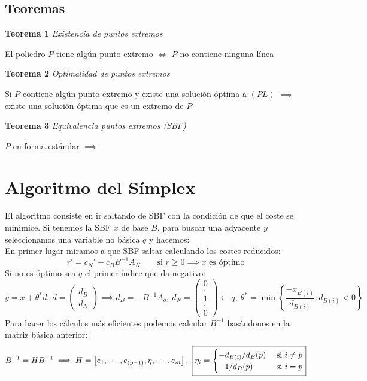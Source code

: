 \documentclass[leqno]{article}
\begin{document}
\subsection{Teoremas}
\textbf{Teorema 1} \textit{Existencia de puntos extremos}
\begin{center}
    El poliedro $P$ tiene algún punto extremo $\iff$ $P$ no contiene ninguna línea
\end{center}
\textbf{Teorema 2} \textit{Optimalidad de puntos extremos}
\begin{center}
    Si $P$ contiene algún punto extremo y existe una solución óptima a $(PL)$ $\implies$ existe una solución óptima que es un extremo de $P$
\end{center}
\textbf{Teorema 3} \textit{Equivalencia puntos extremos (SBF)}
\begin{center}
    $P$ en forma estándar $\implies$ 
\end{center}

\section{Algoritmo del Símplex}
El algoritmo consiste en ir saltando de SBF con la condición de que el coste se minimice. Si tenemos la SBF $x$ de base $B$, para buscar una adyacente $y$ seleccionamos una variable no básica $q$ y hacemos: \\
En primer lugar miramos a que SBF saltar calculando los costes reducidos:
$$
\boxed{r' = c_N' - c_BB^{-1}A_N} \qquad \text{si } r\geq 0 \implies x \text{ es óptimo}
$$
Si no es óptimo sea $q$ el primer índice que da negativo:
$$
y = x + \theta^*d, \
d = \begin{pmatrix}
d_B \\
d_N
\end{pmatrix} \implies 
\boxed{d_B = -B^{-1}A_q}, \ \boxed{d_N = \begin{pmatrix}
0 \\
. \\
1 \\
. \\
0 
\end{pmatrix} \leftarrow q}, \
\boxed{\theta^* = \min \left\lbrace\frac{-x_{B(i)}}{d_{B(i)}}:d_{B(i)}<0  \right\rbrace}
$$
Para hacer los cálculos más eficientes podemos calcular $B^{-1}$ basándonos en la matriz básica anterior:
$$
 \Bar{B}^{-1} = HB^{-1} \implies
H=\left[ e_1, \cdots, e_{(p-1)}, \eta, \cdots, e_m  \right], \ \boxed{\eta_i = \begin{cases}
    -d_{B(i)}/d_B(p) &\text{ si } i\neq p \\
    -1/d_B(p) &\text{ si } i = p
\end{cases}}
$$
\end{document}
